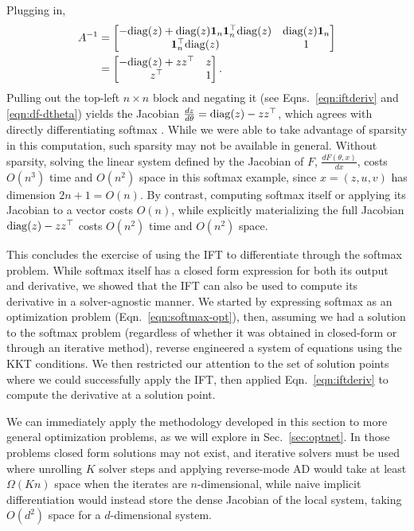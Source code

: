 \documentclass[11pt]{article}
\begin{document}
Plugging in,
\begin{equation}
\begin{aligned}
A^{-1} 
&= \begin{bmatrix}
    -\mathrm{diag}(z) + \mathrm{diag}(z)\mathbf{1}_n\mathbf{1}^\top_n\mathrm{diag}(z)
    & \mathrm{diag}(z)\mathbf{1}_n\\
    \mathbf{1}^\top_n \mathrm{diag}(z) & 1
\end{bmatrix}\\
&= \begin{bmatrix}
    -\mathrm{diag}(z) + zz^\top
    & z\\
    z^\top & 1
\end{bmatrix}.
\end{aligned}
\end{equation}
Pulling out the top-left $n\times n$ block and negating it
(see Eqns.~\ref{eqn:iftderiv} and \ref{eqn:df-dtheta}) yields
the Jacobian $\frac{d z}{d\theta} = \mathrm{diag}(z) - zz^\top$,
which agrees with directly differentiating softmax \citep{sparsemax}.
While we were able to take advantage of sparsity in this computation,
such sparsity may not be available in general.
Without sparsity, solving the linear system defined by the Jacobian of $F$,
$\frac{dF(\theta,x)}{dx}$, costs $O(n^3)$ time and $O(n^2)$ space in this
softmax example, since $x=(z,u,v)$ has dimension $2n+1=O(n)$.
By contrast, computing softmax itself or applying its Jacobian to a vector costs $O(n)$,
while explicitly materializing the full Jacobian
$\mathrm{diag}(z) - zz^\top$ costs $O(n^2)$ time and $O(n^2)$ space.

This concludes the exercise of using the IFT to differentiate through the softmax problem.
While softmax itself has a closed form expression for both its output and derivative,
we showed that the IFT can also be used to compute its derivative in a solver-agnostic manner.
We started by expressing softmax as an optimization problem (Eqn.~\ref{eqn:softmax-opt}),
then, assuming we had a solution to the softmax problem (regardless of whether it was obtained
in closed-form or through an iterative method),
reverse engineered a system of equations using the KKT conditions.
We then restricted our attention to the set of solution points where we could successfully
apply the IFT,
then applied Eqn.~\ref{eqn:iftderiv} to compute the derivative at a solution point.

We can immediately apply the methodology developed in this section to more general
optimization problems, as we will explore in Sec.~\ref{sec:optnet}.
In those problems closed form solutions may not exist, and iterative solvers must be used
where unrolling $K$ solver steps and applying reverse-mode AD would take
at least $\Omega(Kn)$ space when the iterates are $n$-dimensional,
while naive implicit differentiation would instead store the dense Jacobian of the
local system, taking $O(d^2)$ space for a $d$-dimensional system.
\end{document}
